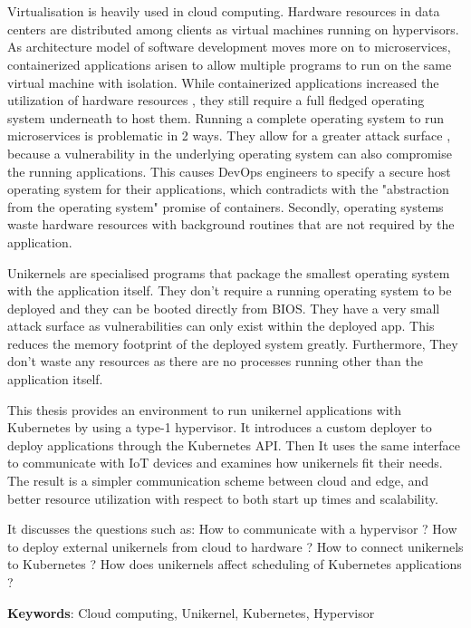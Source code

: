\chapter{\abstractname}

Virtualisation is heavily used in cloud computing. Hardware resources in data centers are distributed among clients as virtual machines running on hypervisors. As architecture model of software development moves more on to microservices, containerized applications arisen to allow multiple programs to run on the same virtual machine with isolation. While containerized applications increased the utilization of hardware resources , they still require a full fledged operating system underneath to host them.
Running a complete operating system to run microservices is problematic in 2 ways. They allow for a greater attack surface , because a vulnerability in the underlying operating system can also compromise the running applications. This causes DevOps engineers to specify a secure host operating system for their applications, which contradicts with the "abstraction from the operating system" promise of containers. Secondly, operating systems waste hardware resources with background routines that are not required by the application. 

Unikernels are specialised programs that package the smallest operating system with the application itself. They don't require a running operating system to be deployed and they can be booted directly from BIOS. They have a very small attack surface as vulnerabilities can only exist within the deployed app. This reduces the memory footprint of the deployed system greatly. Furthermore, They don't waste any resources as there are no processes running other than the application itself. 

This thesis provides an environment to run unikernel applications with Kubernetes by using a type-1 hypervisor. It introduces a custom deployer to deploy applications through the Kubernetes API. Then It uses the same interface to communicate with IoT devices and examines how unikernels fit their needs. The result is a simpler communication scheme between cloud and edge, and better resource utilization with respect to both start up times and scalability.

It discusses the questions such as: How to communicate with a hypervisor ? How to deploy external unikernels from cloud to hardware ? How to connect unikernels to Kubernetes ? How does unikernels affect scheduling of Kubernetes applications ?

\textbf{Keywords}: Cloud computing, Unikernel, Kubernetes, Hypervisor
